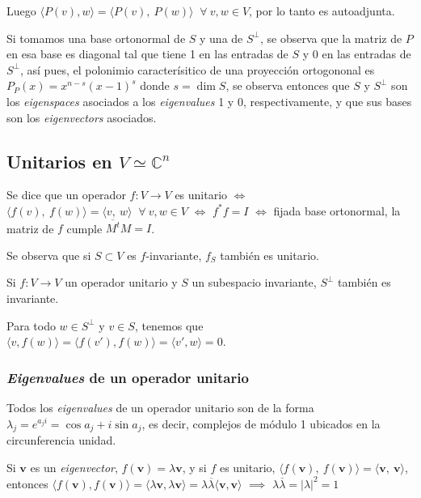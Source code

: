 \documentclass{preset}
\newcommand{\compconj}[1]{%
  \overline{#1}%
}
\begin{document}
\vspace{-10pt}
Luego $\langle P(v) {,} w \rangle = \langle P(v) {,} \ P(w) \rangle \;\; \forall \ v,w \in V$, por lo tanto es autoadjunta.

Si tomamos una base ortonormal de $S$ y una de $S^\perp$, se observa que la matriz de $P$ en esa base es diagonal tal que tiene 1 en las entradas de $S$ y 0 en las entradas de $S^\perp$, así pues, el polonimio caracterísitico de una proyección ortogononal es $P_P(x)=x^{n-s}(x-1)^s$ donde $s=\dim S$, se observa entonces que $S$ y $S^\perp$ son los \textit{eigenspaces} asociados a los \textit{eigenvalues} 1 y 0, respectivamente, y que sus bases son los \textit{eigenvectors} asociados.

\vspace{-15pt}
\subsection{Unitarios en $V\simeq \mathbb{C}^n$}

Se dice que un operador $f:V\rightarrow V$ es unitario $\iff$ $\langle f(v) {,} \ f(w)\rangle=\langle v {,} \ w \rangle \;\; \forall \ v,w \in V$ $\iff$ $f^* f = I$ $\iff$ fijada base ortonormal, la matriz de $f$ cumple $\compconj{M^{t}} M = I$.

Se observa que si $S\subset V$ es $f$-invariante, $f_S$ también es unitario.

\noindent Si $f: V \rightarrow V$ un operador unitario y $S$ un subespacio invariante, $S^\perp$ también es invariante.

Para todo $w \in S^\perp$ y $v \in S$, tenemos que $\langle v {,} f(w) \rangle=\langle f(v') {,} f(w) \rangle=\langle v' {,} w \rangle=0$.

\vspace{-15pt}
\subsubsection{\textit{Eigenvalues} de un operador unitario}

\vspace{-15pt}
Todos los \textit{eigenvalues} de un operador unitario son de la forma $\lambda_j=e^{a_j i}=\cos{a_j}+i\sin{a_j}$, es decir, complejos de módulo 1 ubicados en la circunferencia unidad.

Si $\textbf{v}$ es un \textit{eigenvector}, $f(\textbf{v})=\lambda \textbf{v}$, y si $f$ es unitario, $\langle f(\textbf{v}) {,} \ f(\textbf{v})\rangle=\langle \textbf{v} {,} \ \textbf{v} \rangle$, entonces $\langle f(\textbf{v}) {,} f(\textbf{v}) \rangle=\langle \lambda \textbf{v} {,} \lambda \textbf{v} \rangle= \lambda \compconj{\lambda}\langle \textbf{v} {,} \textbf{v} \rangle$ $\implies$ $\lambda \compconj{\lambda} = |\lambda|^2 =  1$
\end{document}
